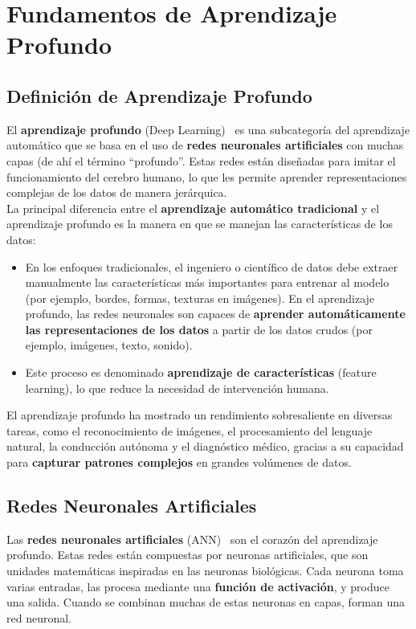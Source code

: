 \chapter{Fundamentos de Aprendizaje Profundo}\label{ch:fundamentos-de-aprendizaje-profundo}
\section{Definición de Aprendizaje Profundo}\label{sec:definicion-de-aprendizaje-profundo}
El \textbf{aprendizaje profundo} (Deep Learning)~\cite{} es una subcategoría del aprendizaje automático que se basa
en el uso de \textbf{redes neuronales artificiales} con muchas capas (de ahí el término ``profundo''.
Estas redes están diseñadas para imitar el funcionamiento del cerebro humano, lo que les permite aprender
representaciones complejas de los datos de manera jerárquica. \\[2pt]

La principal diferencia entre el \textbf{aprendizaje automático tradicional} y el aprendizaje profundo es la manera en
que se manejan las características de los datos:
\begin{itemize}
    \item En los enfoques tradicionales, el ingeniero o científico de datos debe extraer manualmente las
características más importantes para entrenar al modelo (por ejemplo, bordes, formas, texturas en imágenes).
En el aprendizaje profundo, las redes neuronales son capaces de
\textbf{aprender automáticamente las representaciones de los datos} a partir de los datos crudos (por ejemplo,
imágenes, texto, sonido).
    \item Este proceso es denominado \textbf{aprendizaje de características} (feature learning), lo que reduce la
necesidad de intervención humana.
\end{itemize}

El aprendizaje profundo ha mostrado un rendimiento sobresaliente en diversas tareas, como el reconocimiento de
imágenes, el procesamiento del lenguaje natural, la conducción autónoma y el diagnóstico médico, gracias a su capacidad
para \textbf{capturar patrones complejos} en grandes volúmenes de datos.

\section{Redes Neuronales Artificiales}\label{sec:redes-neuronales-artificiales}
Las \textbf{redes neuronales artificiales} (ANN)~\cite{Handbook of measuring system design} son el corazón del
aprendizaje profundo.
Estas redes están compuestas por neuronas artificiales, que son unidades matemáticas inspiradas en las neuronas
biológicas.
Cada neurona toma varias entradas, las procesa mediante una \textbf{función de activación}, y produce una salida.
Cuando se combinan muchas de estas neuronas en capas, forman una red neuronal.

